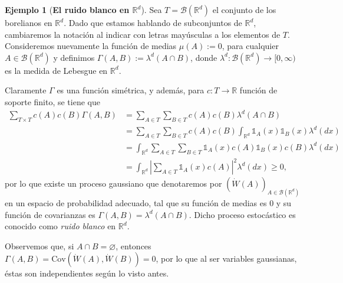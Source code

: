 \documentclass[letterpaper,twoside,12pt]{book}
\newcommand{\R}{\mathbb{R}}
\newcommand{\B}{\mathcal{B}}
\newcommand{\W}{\dot{W}}
\newcommand{\1}{\mathds{1}}
\newcommand{\abs}[1]{\left\lvert #1 \right\rvert}
\renewcommand{\to}{\rightarrow}
\theoremstyle{definition}
\theoremstyle{definition}
\theoremstyle{remark}
\theoremstyle{definition}
\theoremstyle{definition}
\theoremstyle{definition}
\theoremstyle{definition}
\newtheorem{ejem}{Ejemplo}
\theoremstyle{definition}
\begin{document}
\begin{ejem}[\textbf{El ruido blanco en $\R^{d}$}] 
Sea $T=\B(\R^{d})$ el conjunto de los borelianos en $\R^d$.
Dado que estamos hablando de subconjuntos de $\R^{d}$, cambiaremos la notación al indicar con letras mayúsculas a los elementos de $T$.
Consideremos nuevamente la función de medias $\mu(A):=0$, para cualquier $A\in \B(\R^{d})$ y definimos $\Gamma(A,B):=\lambda^{d}(A\cap B)$, donde $\lambda^{d}:\B(\R^{d})\to [0,\infty)$ es la medida de Lebesgue en $\R^{d}$.

 Claramente $\Gamma$ es una función simétrica, y además, para $c:T\to\R$ función de soporte finito, se tiene que 
 \begin{align*}
    \sum_{T\times T}^{}c(A)c(B)\Gamma(A,B)&=\sum_{A\in T}^{}\sum_{B\in T}c(A)c(B)\lambda^{d}(A\cap B)\\
    &=\sum_{A\in T}^{}\sum_{B\in T}c(A)c(B)\int_{\R^d}\1_{A}(x)\1_{B}(x)\lambda^{d}(dx)\\
    &=\int_{\R^{d}}\sum_{A\in T}\sum_{B\in T}\1_{A}(x)c(A)\1_{B}(x)c(B)\lambda^{d}(dx)\\
    &=\int_{\R^{d}}\abs{\sum_{A\in T}\1_{A}(x)c(A)}^2\lambda^{d}(dx)\geq0,
    \end{align*}
por lo que existe un proceso gaussiano que denotaremos por $(\dot{W}(A))_{A\in \B(\R^{d})}$ en un espacio de probabilidad adecuado, tal que su función de medias es $0$ y su función de covarianzas es $\Gamma(A,B)=\lambda^{d}(A\cap B)$. Dicho proceso estocástico es conocido como \textit{ruido blanco} en $\R^{d}$.

Observemos que, si $A\cap B=\varnothing$, entonces $\Gamma(A,B)=\text{Cov}\left(\W(A),\W(B)\right)=0$, por lo que al ser variables gaussianas, éstas son independientes según lo visto antes.


\end{ejem}
\end{document}
